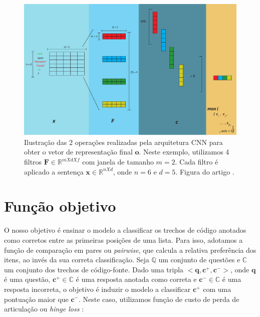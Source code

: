 \begin{figure}[h]
    \centering
    \includegraphics[width=1\textwidth]{figuras/cap-problema/cnn-steps-word-embedding-article.pdf}
    \caption[Ilustração das 2 operações realizadas pela arquitetura CNN para obter o vetor de representação final $\bm{o}$.]{Ilustração das 2 operações realizadas pela arquitetura CNN para obter o vetor de representação final $\bm{o}$. Neste exemplo, utilizamos 4 filtros $\bm{F} \in \mathbb{R}^{m X d X f}$ com janela de tamanho $m = 2$. Cada filtro é aplicado a sentença $\bm{x} \in \mathbb{R}^{n X d}$, onde $n = 6$ e $d = 5$. Figura do artigo \cite{martins2020concra}.}
    \label{fig:cnn-architecture-proposal}
\end{figure}




\section{Função objetivo}
\label{sec:funcao-objetivo}

O nosso objetivo é ensinar o modelo a classificar os trechos de código anotados como corretos entre as primeiras posições de uma lista. Para isso, adotamos a função de comparação em pares ou \textit{pairwise}, que calcula a relativa preferência dos itens, ao invés da sua correta classificação. Seja $\mathbb{Q}$ um conjunto de questões e $\mathbb{C}$ um conjunto dos trechos de código-fonte. Dado uma tripla $<\bm{q}, \bm{c^{+}}, \bm{c^{-}}>$, onde $\bm{q}$ 
é uma questão, $\bm{c^{+}} \in \mathbb{C}$ é uma resposta anotada como correta e $\bm{c^{-}} \in \mathbb{C}$ é uma resposta incorreta, o objetivo é induzir o modelo a classificar $\bm{c^{+}}$ com uma pontuação maior que $\bm{c^{-}}$. Neste caso, utilizamos função de custo de perda de articulação ou \textit{hinge loss} \citep{feng-2015}:

